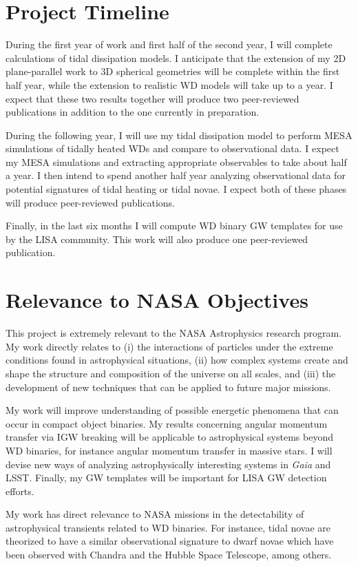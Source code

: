 \documentclass[12pt,
        usenames, %
        dvipsnames %
    ]{article}
\begin{document}
\section{Project Timeline}

During the first year of work and first half of the second year, I will complete
calculations of tidal dissipation models. I anticipate that the extension of my
2D plane-parallel work to 3D spherical geometries will be complete within the
first half year, while the extension to realistic WD models will take up to a
year. I expect that these two results together will produce two peer-reviewed
publications in addition to the one currently in preparation.

During the following year, I will use my tidal dissipation model to perform MESA
simulations of tidally heated WDs and compare to observational data. I expect my
MESA simulations and extracting appropriate observables to take about half a
year. I then intend to spend another half year analyzing observational data for
potential signatures of tidal heating or tidal novae. I expect both of these
phases will produce peer-reviewed publications.

Finally, in the last six months I will compute WD binary GW templates for use by
the LISA community. This work will also produce one peer-reviewed publication.

\section{Relevance to NASA Objectives}

This project is extremely relevant to the NASA Astrophysics research program.
My work directly relates to (i) the interactions of particles under the extreme
conditions found in astrophysical situations, (ii) how complex systems create
and shape the structure and composition of the universe on all scales, and (iii)
the development of new techniques that can be applied to future major missions.

My work will improve understanding of possible energetic phenomena that can
occur in compact object binaries. My results concerning angular momentum
transfer via IGW breaking will be applicable to astrophysical systems beyond WD
binaries, for instance angular momentum transfer in massive
stars\cite{l_trans_rev}. I will devise new ways of analyzing astrophysically
interesting systems in \emph{Gaia} and LSST\@. Finally, my GW templates will be
important for LISA GW detection efforts.

My work has direct relevance to NASA missions in the detectability of
astrophysical transients related to WD binaries. For instance, tidal novae are
theorized to have a similar observational signature to dwarf novae which have
been observed with Chandra and the Hubble Space Telescope, among others.

\clearpage

\printbibliography
\end{document}

